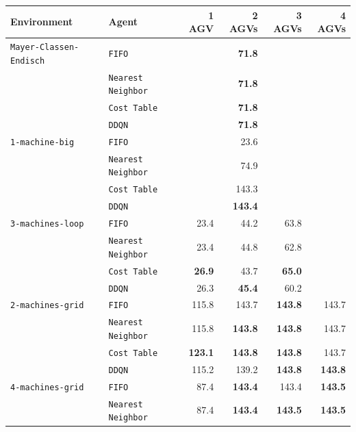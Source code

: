 \documentclass[sn-mathphys]{sn-jnl}
\begin{document}
\begin{table}[ht]
\centering
\bgroup
\def\arraystretch{1.1} %
    
\begin{tabular}{|l|l||r|r|r|r|}
\hline
Environment & Agent & 1 AGV & 2 AGVs & 3 AGVs & 4 AGVs \\
\hline \texttt{Mayer-Classen-Endisch} & \texttt{FIFO}& & \textbf{71.8} \quad & &  \\ 
 & \texttt{Nearest Neighbor} & & \textbf{71.8} \quad & &  \\ 
 & \texttt{Cost Table} & & \textbf{71.8} \quad & &  \\ 
 & \texttt{DDQN} & & \textbf{71.8} \quad & &  \\ 
\hline \texttt{1-machine-big} & \texttt{FIFO}& & 23.6  \quad & &  \\ 
 & \texttt{Nearest Neighbor} & & 74.9  \quad & &  \\ 
 & \texttt{Cost Table} & & 143.3  \quad & &  \\ 
 & \texttt{DDQN} & & \textbf{143.4} \quad & &  \\ 
\hline \texttt{3-machines-loop} & \texttt{FIFO}& 23.4  \quad & 44.2  \quad & 63.8  \quad &  \\ 
 & \texttt{Nearest Neighbor} & 23.4  \quad & 44.8  \quad & 62.8  \quad &  \\ 
 & \texttt{Cost Table} & \textbf{26.9} \quad & 43.7  \quad & \textbf{65.0} \quad &  \\ 
 & \texttt{DDQN} & 26.3  \quad & \textbf{45.4} \quad & 60.2  \quad &  \\ 
\hline \texttt{2-machines-grid} & \texttt{FIFO}& 115.8  \quad & 143.7  \quad & \textbf{143.8} \quad & 143.7  \quad  \\ 
 & \texttt{Nearest Neighbor} & 115.8  \quad & \textbf{143.8} \quad & \textbf{143.8} \quad & 143.7  \quad  \\ 
 & \texttt{Cost Table} & \textbf{123.1} \quad & \textbf{143.8} \quad & \textbf{143.8} \quad & 143.7  \quad  \\ 
 & \texttt{DDQN} & 115.2  \quad & 139.2  \quad & \textbf{143.8} \quad & \textbf{143.8} \quad  \\ 
\hline \texttt{4-machines-grid} & \texttt{FIFO}& 87.4  \quad & \textbf{143.4} \quad & 143.4  \quad & \textbf{143.5} \quad  \\ 
 & \texttt{Nearest Neighbor} & 87.4  \quad & \textbf{143.4} \quad & \textbf{143.5} \quad & \textbf{143.5} \quad  \\ 

\end{tabular}
\end{table}
\end{document}

